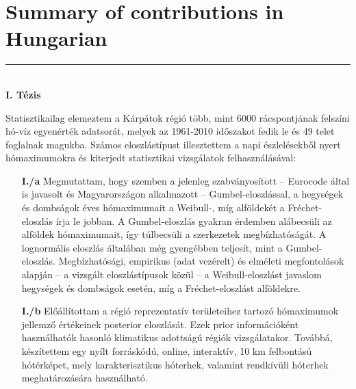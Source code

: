 
\chapter{Summary of contributions in Hungarian}
\label{ap:hun_theses}

\begin{otherlanguage}{hungarian}
\begin{center}
	\noindent\rule[0.5ex]{0.5\linewidth}{0.5pt} \\[10pt]
	\textbf{I. Tézis} \hfill \\[13pt]
\end{center}
	Statisztikailag elemeztem a Kárpátok régió több, mint 6000 rácspontjának felszíni hó-víz egyenérték adatsorát, melyek az 1961-2010 időszakot fedik le és 49 telet foglalnak magukba. Számos eloszlástípust illesztettem a napi észlelésekből nyert hómaximumokra és kiterjedt statisztikai vizsgálatok felhasználásával:
\begin{enumerate}[leftmargin=*, align=left, labelwidth=*]
	\item[\textbf{I./a}] Megmutattam, hogy szemben a jelenleg szabványosított -- Eurocode által is javasolt és Magyarországon alkalmazott -- Gumbel-eloszlással, a hegységek és dombságok éves hómaximumait a Weibull-, míg alföldekét a Fréchet-eloszlás írja le jobban. A Gumbel-eloszlás gyakran érdemben alábecsüli az alföldek hómaximumait, így túlbecsüli a szerkezetek megbízhatóságát. A lognormális eloszlás általában még gyengébben teljesít, mint a Gumbel-eloszlás. Megbízhatósági, empirikus (adat vezérelt) és elméleti megfontolások alapján -- a vizsgált eloszlástípusok közül -- a Weibull-eloszlást javaslom hegységek és dombságok esetén, míg a Fréchet-eloszlást alföldekre.
	
	\item[\textbf{I./b}] Előállítottam a régió reprezentatív területeihez tartozó hómaximumok jellemző értékeinek posterior eloszlását. Ezek prior információként használhatók hasonló klimatikus adottságú régiók vizsgálatakor. Továbbá, készítettem egy nyílt forráskódú, online, interaktív, 10 km felbontású hótérképet, mely karakterisztikus hóterhek, valamint rendkívüli hóterhek meghatározására használható. 
\end{enumerate}

\citep{RozsasAMM2016, RozsasESREL2015, VighTO2016, RozsasIABSE2015}



\end{otherlanguage}
